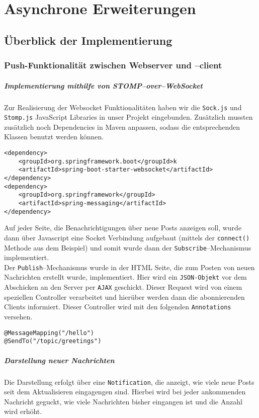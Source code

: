 \chapter{Asynchrone Erweiterungen}
\section{Überblick der Implementierung}
\subsection{Push-Funktionalität zwischen Webserver und --client}
\paragraph{Implementierung mithilfe von STOMP--over--WebSocket}
Zur Realisierung der Websocket Funktionalitäten haben wir die \texttt{Sock.js} und \texttt{Stomp.js} JavaScript Libraries in unser Projekt eingebunden. Zusätzlich mussten zusätzlich noch Dependencies in Maven anpassen, sodass die entsprechenden Klassen benutzt werden können.
\begin{verbatim}
<dependency>
    <groupId>org.springframework.boot</groupId>k
    <artifactId>spring-boot-starter-websocket</artifactId>
</dependency>
<dependency>
    <groupId>org.springframework</groupId>
    <artifactId>spring-messaging</artifactId>
</dependency>
\end{verbatim}

Auf jeder Seite, die Benachrichtigungen über neue Posts anzeigen soll, wurde dann über Javascript eine Socket Verbindung aufgebaut (mittels der \texttt{connect()} Methode aus dem Beispiel) und somit wurde dann der \texttt{Subscribe}--Mechanismus implementiert.\\
Der \texttt{Publish}--Mechanismus wurde in der HTML Seite, die zum Posten von neuen Nachrichten erstellt wurde, implementiert. Hier wird ein \texttt{JSON-Objekt} vor dem Abschicken an den Server per \texttt{AJAX} geschickt. Dieser Request wird von einem speziellen Controller verarbeitet und hierüber werden dann die abonnierenden Clients informiert. Dieser Controller wird mit den folgenden \texttt{Annotations} versehen.

\begin{verbatim}
@MessageMapping("/hello")
@SendTo("/topic/greetings")
\end{verbatim}

\paragraph{Darstellung neuer Nachrichten}
Die Darstellung erfolgt über eine \texttt{Notification}, die anzeigt, wie viele neue Posts seit dem Aktualisieren eingagengen sind. Hierbei wird bei jeder ankommenden Nachricht geguckt, wie viele Nachrichten bisher eingangen ist und die Anzahl wird erhöht.

